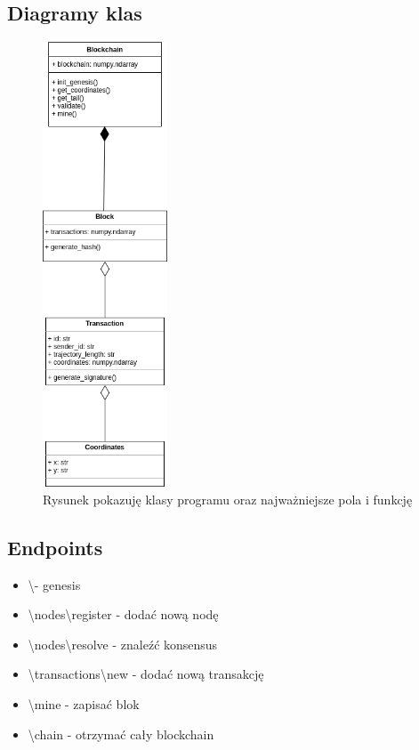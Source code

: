 \documentclass{sprawozdanie-agh}
\begin{document}
\newpage
\subsection{Diagramy klas}
    \begin{figure}[htbp]
        \centerline{\includegraphics[width=140px,height=500px]{Blockchain.png}}
        \caption{Rysunek pokazuję klasy programu oraz najważniejsze pola i funkcję}
        \label{fig}
    \end{figure}


\newpage
\subsection{Endpoints}

\begin{itemize}
    \item \textbackslash  - genesis
    \item \textbackslash nodes\textbackslash register - dodać nową nodę
    \item \textbackslash nodes\textbackslash resolve - znaleźć konsensus
    \item \textbackslash transactions\textbackslash new - dodać nową transakcję
    \item \textbackslash mine - zapisać blok
    \item \textbackslash chain - otrzymać cały blockchain
    
\end{itemize}
\end{document}
